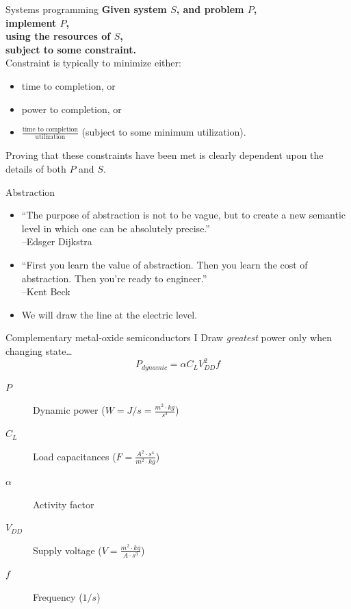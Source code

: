 \documentclass[xcolor={dvipsnames,table}]{beamer}
\begin{document}
\begin{frame}{Systems programming}
\textbf{Given system $S$, and problem $P$,\\
implement $P$,\\
using the resources of $S$,\\
subject to some constraint.}\\
\vspace{.25in}
Constraint is typically to minimize either:
\begin{itemize}
\vspace{.05in}
\item time to completion, or
\vspace{.05in}
\item power to completion, or
\vspace{.05in}
\item $\frac{\text{time to completion}}{\text{utilization}}$
(subject to some minimum utilization).
\end{itemize}
\vspace{.25in}
Proving that these constraints have been met is clearly
dependent upon the details of both $P$ and $S$.
\end{frame}

\begin{frame}{Abstraction}
\begin{itemize}
\item ``The purpose of abstraction is not to be vague, but to create a new semantic level in which one can be absolutely precise.''\\
\hfill--Edsger Dijkstra
\vfill
\item ``First you learn the value of abstraction. Then you learn the cost of abstraction. Then you're ready to engineer.''\\
\hfill--Kent Beck
\vfill
\item We will draw the line at the electric level.
\end{itemize}
\end{frame}

\begin{frame}{Complementary metal-oxide semiconductors I}
Draw \textit{greatest} power only when changing state\ldots
\begin{equation}
P_{dynamic} = \alpha C_LV_{DD}^{2}f \nonumber
\end{equation}
\begin{description}
\item[$P$] Dynamic power ($W = J/s = \frac{m^{2}\cdot kg}{s^{3}}$)
\item[$C_L$] Load capacitances ($F = \frac{A^{2}\cdot s^{4}}{m^{2}\cdot kg}$)
\item[$\alpha$] Activity factor
\item[$V_{DD}$] Supply voltage ($V = \frac{m^{2}\cdot kg}{A\cdot s^{3}}$)
\item[$f$] Frequency ($1/s$)
\end{description}
\end{frame}
\end{document}

